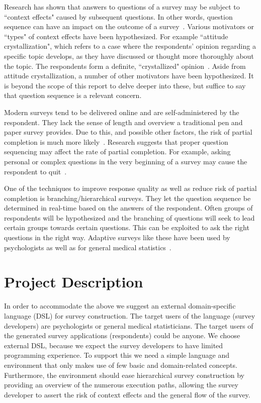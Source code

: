 \documentclass[runningheads,a4paper]{llncs}
\begin{document}
Research has shown that answers to questions of a survey may be subject to ``context effects" caused by subsequent questions. In other words, question sequence can have an impact on the outcome of a survey~\cite{synodinos,johnson,martin}. Various motivators or ``types" of context effects have been hypothesized. For example ``attitude crystallization", which refers to a case where the respondents' opinion regarding a specific topic develops, as they have discussed or thought more thoroughly about the topic. The respondents form a definite, ``crystallized" opinion~\cite{johnson}. Aside from attitude crystallization, a number of other motivators have been hypothesized. It is beyond the scope of this report to delve deeper into these, but suffice to say that question sequence is a relevant concern. 

Modern surveys tend to be delivered online and are self-administered by the respondent. They lack the sense of length and overview a traditional pen and paper survey provides. Due to this, and possible other factors, the risk of partial completion is much more likely~\cite{lumsden_morgan}. Research suggests that proper question sequencing may affect the rate of partial completion. For example, asking personal or complex questions in the very beginning of a survey may cause the respondent to quit~\cite{lumsden_morgan}.

One of the techniques to improve response quality as well as reduce risk of partial completion is branching/hierarchical surveys. They let the question sequence be determined in real-time based on the answers of the respondent. Often groups of respondents will be hypothesized and the branching of questions will seek to lead certain groups towards certain questions. This can be exploited to ask the right questions in the right way. Adaptive surveys like these have been used by psychologists as well as for general medical statistics~\cite{schouten}.

\section{Project Description}
\label{project_description}
In order to accommodate the above we suggest an external domain-specific language (DSL) for survey construction. The target users of the language (survey developers) are psychologists or general medical statisticians. The target users of the generated survey applications (respondents) could be anyone. We choose external DSL, because we expect the survey developers to have limited programming experience. To support this we need a simple language and environment that only makes use of few basic and domain-related concepts. Furthermore, the environment should ease hierarchical survey construction by providing an overview of the numerous execution paths, allowing the survey developer to assert the risk of context effects and the general flow of the survey.
\end{document}
